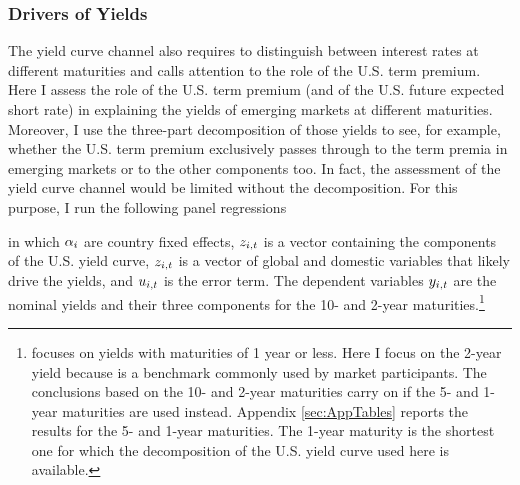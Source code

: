 {\subsubsection{Drivers of Yields}
The yield curve channel also requires to distinguish between interest rates at different maturities and calls attention to the role of the U.S. term premium.
Here I assess the role of the U.S. term premium (and of the U.S. future expected short rate)
in explaining the yields of emerging markets at different maturities.
Moreover, I use the three-part decomposition of those yields to see, for example, whether the U.S. term premium exclusively passes through to the term premia in emerging markets or to the other components too.
In fact, the assessment of the yield curve channel would be limited without the decomposition.
For this purpose, I run the following panel regressions 

\noindent in which \(\alpha_{i}\) are country fixed effects, \(z_{i,t}\) is a vector containing the components of the U.S. yield curve, \(z_{i,t}\) is a vector of global and domestic variables that likely drive the yields, and \(u_{i,t}\) is the error term. 
The dependent variables \(y_{i,t}\) are the nominal yields and their three components 
for the 10- and 2-year maturities.\footnote{ \cite{Kalemli-Ozcan:2019} focuses on yields with maturities of 1 year or less. Here I focus on the 2-year yield because is a benchmark commonly used by market participants. The conclusions based on the 10- and 2-year maturities carry on if the 5- and 1-year maturities are used instead. Appendix \ref{sec:AppTables} reports the results for the 5- and 1-year maturities. The 1-year maturity is the shortest one for which the decomposition of the U.S. yield curve used here is available.}
}

